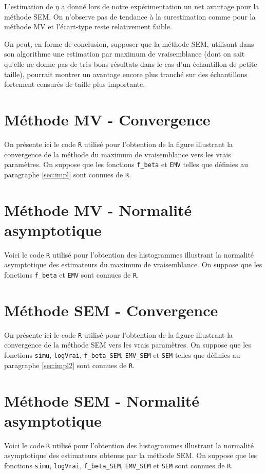 \documentclass[a4paper]{report}
\begin{document}
L'estimation de $\eta$ a donné lors de notre expérimentation un net avantage pour la méthode SEM. On n'observe pas de tendance à la surestimation comme pour la méthode MV et l'écart-type reste relativement faible. 

On peut, en forme de conclusion, supposer que la méthode SEM, utilisant dans son algorithme une estimation par maximum de vraisemblance (dont on sait qu'elle ne donne pas de très bons résultats dans le cas d'un échantillon de petite taille), pourrait montrer un avantage encore plus tranché sur des échantillons fortement censurés de taille plus importante. 

  
 \begin{appendix}
 \chapter{Méthode MV - Convergence}
 \label{MV_cv}
 On présente ici le code \verb|R| utilisé pour l'obtention de la figure illustrant la convergence de la méthode du maximum de vraisemblance vers les vrais paramètres. On suppose que les fonctions \verb|f_beta| et \verb|EMV| telles que définies au paragraphe \ref{sec:impl} sont connues de \verb|R|.
  
  
   \chapter{Méthode MV - Normalité asymptotique}
 \label{MV_norm}
 Voici le code \verb|R| utilisé pour l'obtention des histogrammes illustrant la normalité asymptotique des estimateurs du maximum de vraisemblance. On suppose que les fonctions \verb|f_beta| et \verb|EMV| sont connues de \verb|R|.
  
 
  
   \chapter{Méthode SEM - Convergence}
 \label{SEM_cv}
 On présente ici le code \verb|R| utilisé pour l'obtention de la figure illustrant la convergence de la méthode SEM vers les vrais paramètres. On suppose que les fonctions \verb|simu|, \verb|logVrai|, \verb|f_beta_SEM|, \verb|EMV_SEM| et \verb|SEM| telles que définies au paragraphe \ref{sec:impl2} sont connues de \verb|R|.
  
  
   \chapter{Méthode SEM - Normalité asymptotique}
 \label{SEM_norm}
 Voici le code \verb|R| utilisé pour l'obtention des histogrammes illustrant la normalité asymptotique des estimateurs obtenus par la méthode SEM. On suppose que les fonctions \verb|simu|, \verb|logVrai|, \verb|f_beta_SEM|, \verb|EMV_SEM| et \verb|SEM| sont connues de \verb|R|.
  
  

\end{appendix}
\end{document}
